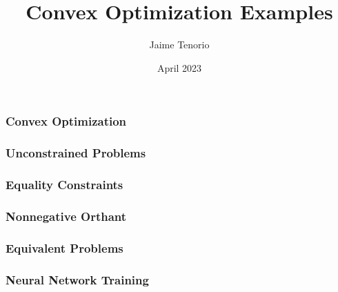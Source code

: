 \documentclass{beamer}
\title{Convex Optimization Examples}
\author{Jaime Tenorio}
\date{April 2023}
\begin{document}
\maketitle

\begin{frame}
    \frametitle{Convex Optimization}
    
\end{frame}

\begin{frame}
        
\end{frame}

\begin{frame}
    \frametitle{Unconstrained Problems}
    
\end{frame}

\begin{frame}
    
\end{frame}

\begin{frame}
    \frametitle{Equality Constraints}
    
\end{frame}

\begin{frame}
    
\end{frame}

\begin{frame}
    \frametitle{Nonnegative Orthant}
    
\end{frame}

\begin{frame}
    
\end{frame}

\begin{frame}
    \frametitle{Equivalent Problems}
    \fontsize{10}{10}\selectfont
    
\end{frame}

\begin{frame}
    
\end{frame}

\begin{frame}
    \frametitle{Neural Network Training}
    
\end{frame}

\begin{frame}
    \fontsize{10}{10}\selectfont
    
\end{frame}

\begin{frame}
    
\end{frame}
\end{document}

